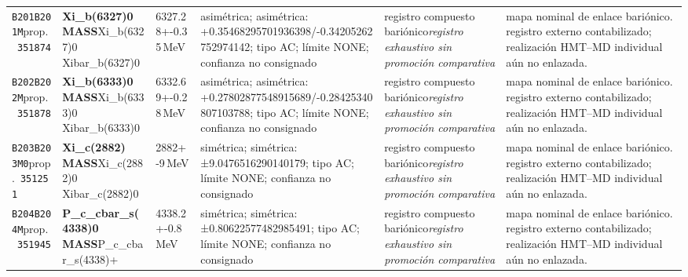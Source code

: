 \begin{landscape}
\begin{longtable}{L{1.85cm}L{4.45cm}L{2.35cm}L{4.05cm}L{3.35cm}L{7.15cm}}
\texttt{B201}\newline \texttt{B201M}\newline prop.\ \texttt{351874} & \textbf{Xi\_\allowbreak{}b(6327)0 MASS}\newline Xi\_\allowbreak{}b(6327)0 \textbar{}\allowbreak{} Xibar\_\allowbreak{}b(6327)0 & 6327.28+-0.35\,MeV & asimétrica; asimétrica: +0.35468295701936398/-0.34205262752974142; tipo AC; límite NONE; confianza no consignado & registro compuesto bariónico\newline \emph{registro exhaustivo sin promoción comparativa} & mapa nominal de enlace bariónico. registro externo contabilizado; realización HMT--MD individual aún no enlazada. \\
\texttt{B202}\newline \texttt{B202M}\newline prop.\ \texttt{351878} & \textbf{Xi\_\allowbreak{}b(6333)0 MASS}\newline Xi\_\allowbreak{}b(6333)0 \textbar{}\allowbreak{} Xibar\_\allowbreak{}b(6333)0 & 6332.69+-0.28\,MeV & asimétrica; asimétrica: +0.27802877548915689/-0.28425340807103788; tipo AC; límite NONE; confianza no consignado & registro compuesto bariónico\newline \emph{registro exhaustivo sin promoción comparativa} & mapa nominal de enlace bariónico. registro externo contabilizado; realización HMT--MD individual aún no enlazada. \\
\texttt{B203}\newline \texttt{B203M0}\newline prop.\ \texttt{351251} & \textbf{Xi\_\allowbreak{}c(2882) MASS}\newline Xi\_\allowbreak{}c(2882)0 \textbar{}\allowbreak{} Xibar\_\allowbreak{}c(2882)0 & 2882+-9\,MeV & simétrica; simétrica: ±9.0476516290140179; tipo AC; límite NONE; confianza no consignado & registro compuesto bariónico\newline \emph{registro exhaustivo sin promoción comparativa} & mapa nominal de enlace bariónico. registro externo contabilizado; realización HMT--MD individual aún no enlazada. \\
\texttt{B204}\newline \texttt{B204M}\newline prop.\ \texttt{351945} & \textbf{P\_\allowbreak{}c\_\allowbreak{}cbar\_\allowbreak{}s(4338)0 MASS}\newline P\_\allowbreak{}c\_\allowbreak{}cbar\_\allowbreak{}s(4338)+ & 4338.2+-0.8\,MeV & simétrica; simétrica: ±0.80622577482985491; tipo AC; límite NONE; confianza no consignado & registro compuesto bariónico\newline \emph{registro exhaustivo sin promoción comparativa} & mapa nominal de enlace bariónico. registro externo contabilizado; realización HMT--MD individual aún no enlazada. \\

\end{longtable}
\end{landscape}
